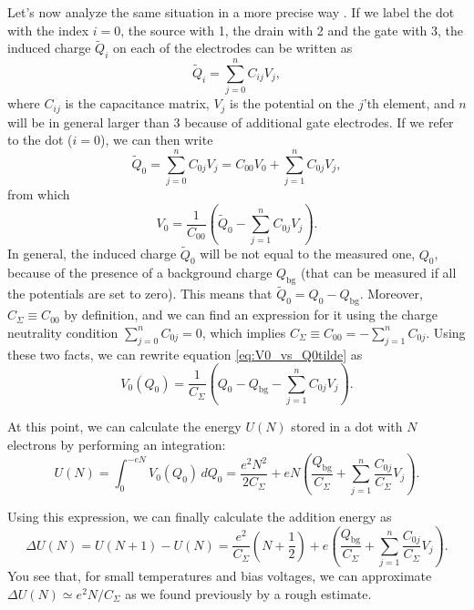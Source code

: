 Let's now analyze the same situation in a more precise way \citep[adapted from][]{Fasth2007}. If we label the dot with the index $i=0$, the source with 1, the drain with 2 and the gate with 3, the induced charge $\tilde{Q}_i$ on each of the electrodes can be written as
\begin{equation}
	\tilde{Q}_i = \sum_{j=0}^{n}C_{ij}V_j,
\end{equation}
where $C_{ij}$ is the capacitance matrix, $V_j$ is the potential on the $j$'th element, and $n$ will be in general larger than 3 because of additional gate electrodes. If we refer to the dot ($i=0$), we can then write
\begin{equation}
	\tilde{Q}_0 = \sum_{j=0}^{n}C_{0j}V_j = C_{00}V_0 + \sum_{j=1}^{n}C_{0j}V_j,
\end{equation}
from which
\begin{equation}
	V_0 = \frac{1}{C_{00}}\left(\tilde{Q}_0 - \sum_{j=1}^{n}C_{0j}V_j\right).
	\label{eq:V0_vs_Q0tilde}
\end{equation}
In general, the induced charge $\tilde{Q}_0$ will be not equal to the measured one, $Q_0$, because of the presence of a background charge $Q_{\text{bg}}$ (that can be measured if all the potentials are set to zero). This means that $\tilde{Q}_0 = Q_0 - Q_{\text{bg}}$. Moreover, $C_{\Sigma} \equiv C_{00}$ by definition, and we can find an expression for it using the charge neutrality condition $\sum_{j=0}^{n}C_{0j}=0$, which implies $C_{\Sigma} \equiv C_{00} = -\sum_{j=1}^{n}C_{0j}$. Using these two facts, we can rewrite equation \eqref{eq:V0_vs_Q0tilde} as
\begin{equation}
	V_0(Q_0) = \frac{1}{C_{\Sigma}}\left(Q_0 - Q_{\text{bg}} - \sum_{j=1}^{n}C_{0j}V_j\right).
	\label{eq:V0_vs_Q0}
\end{equation}

At this point, we can calculate the energy $U(N)$ stored in a dot with $N$ electrons by performing an integration:
\begin{equation}
	U(N) = \int_{0}^{-eN}V_0(Q_0)\,dQ_0 = \frac{e^2N^2}{2C_{\Sigma}} + eN\left( \frac{Q_{\text{bg}}}{C_{\Sigma}} + \sum_{j=1}^{n}\frac{C_{0j}}{C_{\Sigma}}V_j \right).
\end{equation}

Using this expression, we can finally calculate the addition energy as
\begin{equation}
	\Delta U (N) = U(N+1)-U(N) = \frac{e^2}{C_{\Sigma}}\left(N+\frac{1}{2}\right) + e\left( \frac{Q_{\text{bg}}}{C_{\Sigma}} + \sum_{j=1}^{n}\frac{C_{0j}}{C_{\Sigma}}V_j \right).
\end{equation}
You see that, for small temperatures and bias voltages, we can approximate $\Delta U (N) \simeq e^2N/C_{\Sigma}$ as we found previously by a rough estimate.

